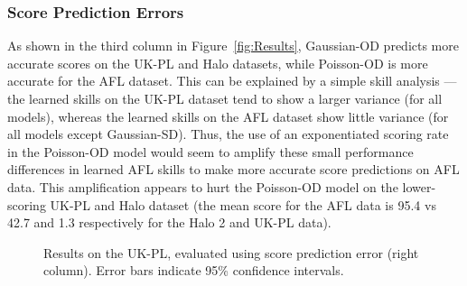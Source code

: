 \subsubsection{Score Prediction Errors}


As shown in the third column in Figure~\ref{fig:Results}, Gaussian-OD
predicts more accurate scores on the UK-PL and Halo datasets, while
Poisson-OD is more accurate for the AFL dataset. This can be explained
by a simple skill analysis --- the learned skills on the UK-PL dataset
tend to show a larger variance (for all models), whereas the learned
skills on the AFL dataset show little variance (for all models except
Gaussian-SD). Thus, the use of an exponentiated scoring rate in the
Poisson-OD model would seem to amplify these small performance
differences in learned AFL skills to make more accurate score
predictions on AFL data.  This amplification appears to hurt the
Poisson-OD model on the lower-scoring UK-PL and Halo dataset (the mean
score for the AFL data is 95.4 vs 42.7 and 1.3 respectively for the
Halo 2 and UK-PL data).

\begin{center}
\begin{figure*}[t!]
 \centering
\caption{\small Results on the UK-PL, evaluated using score
prediction error (right column). Error bars indicate
95\% confidence intervals.}
\label{fig:ScoreError_UK}
\end{figure*}
\end{center}


